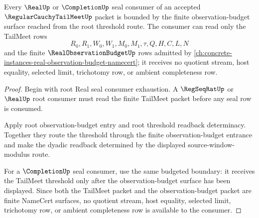 \begin{theorem}
\label{thm:regular-cauchy-tail-meet-root-seal-consumer-boundary}
Every $\RealUp$ or $\CompletionUp$ seal consumer of an accepted $\RegularCauchyTailMeetUp$ packet is bounded by the finite observation-budget surface reached from the root threshold route. The consumer can read only the TailMeet rows
$$
R_0,R_1,W_0,W_1,M_0,M_1,\tau,Q,H,C,L,N
$$
and the finite $\RealObservationBudgetUp$ rows admitted by \autoref{ch:concrete-instances-real-observation-budget-namecert}; it receives no quotient stream, host equality, selected limit, trichotomy row, or ambient completeness row.
\end{theorem}
\begin{proof}
Begin with root Real seal consumer exhaustion. A $\RegSeqRatUp$ or $\RealUp$ root consumer must read the finite TailMeet packet before any seal row is consumed.

Apply root observation-budget entry and root threshold readback determinacy. Together they route the threshold through the finite observation-budget entrance and make the dyadic readback determined by the displayed source-window-modulus route.

For a $\CompletionUp$ seal consumer, use the same budgeted boundary: it receives the TailMeet threshold only after the observation-budget surface has been displayed. Since both the TailMeet packet and the observation-budget packet are finite NameCert surfaces, no quotient stream, host equality, selected limit, trichotomy row, or ambient completeness row is available to the consumer.
\end{proof}

